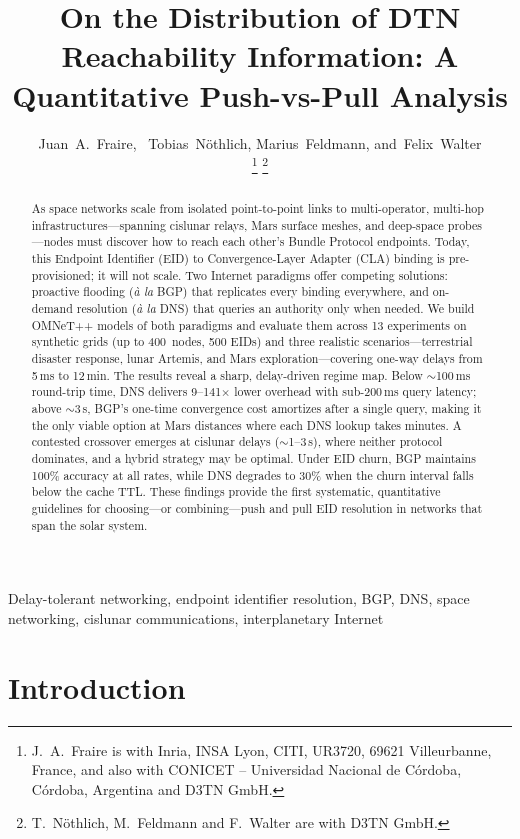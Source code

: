 \documentclass[journal,twocolumn]{IEEEtran}
\title{On the Distribution of DTN Reachability Information:
A Quantitative Push-vs-Pull Analysis}
\author{%
  Juan~A.~Fraire,~\IEEEmembership{Senior Member,~IEEE,}
  Tobias~Nöthlich,
  Marius~Feldmann,
  and~Felix~Walter\\
  \thanks{J.~A.~Fraire is with Inria, INSA Lyon, CITI, UR3720, 69621 Villeurbanne, France, and also with CONICET -- Universidad Nacional de C\'ordoba, C\'ordoba, Argentina and D3TN GmbH.}%
  \thanks{T.~Nöthlich, M.~Feldmann and F.~Walter are with D3TN GmbH.}%
}
\begin{document}
\maketitle

\begin{abstract}
As space networks scale from isolated point-to-point links to multi-operator, multi-hop infrastructures---spanning cislunar relays, Mars surface meshes, and deep-space probes---nodes must discover how to reach each other's Bundle Protocol endpoints.
Today, this Endpoint Identifier (EID) to Convergence-Layer Adapter (CLA) binding is pre-provisioned; it will not scale.
Two Internet paradigms offer competing solutions: proactive flooding (\emph{\`a la} BGP) that replicates every binding everywhere, and on-demand resolution (\emph{\`a la} DNS) that queries an authority only when needed.
We build OMNeT++ models of both paradigms and evaluate them across 13 experiments on synthetic grids (up to 400~nodes, 500 EIDs) and three realistic scenarios---terrestrial disaster response, lunar Artemis, and Mars exploration---covering one-way delays from 5\,ms to 12\,min.
The results reveal a sharp, delay-driven regime map.
Below $\sim$100\,ms round-trip time, DNS delivers 9--141$\times$ lower overhead with sub-200\,ms query latency; above $\sim$3\,s, BGP's one-time convergence cost amortizes after a single query, making it the only viable option at Mars distances where each DNS lookup takes minutes.
A contested crossover emerges at cislunar delays ($\sim$1--3\,s), where neither protocol dominates, and a hybrid strategy may be optimal.
Under EID churn, BGP maintains 100\% accuracy at all rates, while DNS degrades to 30\% when the churn interval falls below the cache TTL.
These findings provide the first systematic, quantitative guidelines for choosing---or combining---push and pull EID resolution in networks that span the solar system.
\end{abstract}

\begin{IEEEkeywords}
Delay-tolerant networking, endpoint identifier resolution, BGP, DNS, space networking, cislunar communications, interplanetary Internet
\end{IEEEkeywords}

\section{Introduction}
\label{sec_intro}
\end{document}
